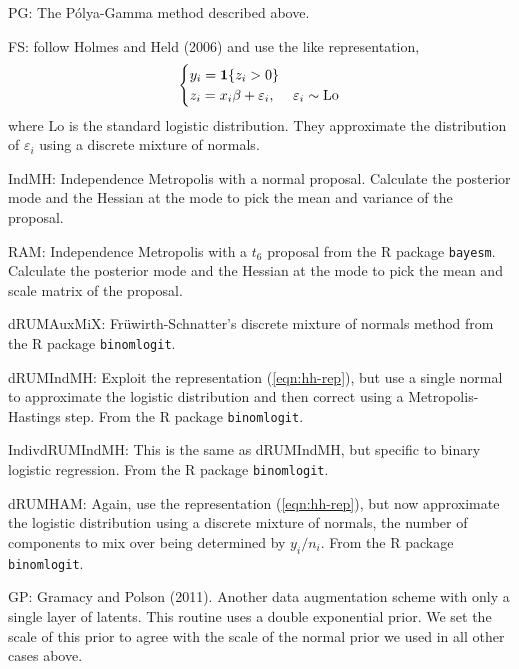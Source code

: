 \documentclass{article}
\newcommand{\one}{\bold{1}}
\newcommand{\ep}{\varepsilon}
\newcommand{\Polya}{P\'{o}lya}
\begin{document}
\begin{outline}

\1 PG: The \Polya-Gamma method described above.

\1 FS: \cite{fruhwirth-schnatter-fruhwirth-2010} follow Holmes and Held (2006)
and use the \cite{albert-chib-1993} like representation,
\begin{equation}
\label{eqn:hh-rep}
\begin{cases}
y_i = \one \{ z_i > 0 \} \\
z_i = x_i \beta + \ep_i, & \ep_i \sim \text{Lo}
\end{cases}
\end{equation}
where $\text{Lo}$ is the standard logistic distribution.  They approximate the
distribution of $\ep_i$ using a discrete mixture of normals.

\1 IndMH: Independence Metropolis with a normal proposal.  Calculate the
posterior mode and the Hessian at the mode to pick the mean and variance of the
proposal.

\1 RAM: Independence Metropolis with a $t_6$ proposal from the R package
\texttt{bayesm}.  Calculate the posterior mode and the Hessian at the mode to
pick the mean and scale matrix of the proposal.

\1 dRUMAuxMiX: Fr\"{u}wirth-Schnatter's discrete mixture of normals method from
the R package \texttt{binomlogit}.

\1 dRUMIndMH: Exploit the representation (\ref{eqn:hh-rep}), but use a single
normal to approximate the logistic distribution and then correct using a
Metropolis-Hastings step.  From the R package \texttt{binomlogit}.

\1 IndivdRUMIndMH: This is the same as dRUMIndMH, but specific to binary
logistic regression.  From the R package \texttt{binomlogit}.

\1 dRUMHAM: Again, use the representation (\ref{eqn:hh-rep}), but now
approximate the logistic distribution using a discrete mixture of normals, the
number of components to mix over being determined by $y_i / n_i$.  From the R
package \texttt{binomlogit}.

\1 GP: Gramacy and Polson (2011).  Another data augmentation scheme with only a
single layer of latents.  This routine uses a double exponential prior.  We set
the scale of this prior to agree with the scale of the normal prior we used in
all other cases above.

\end{outline}


\end{document}
